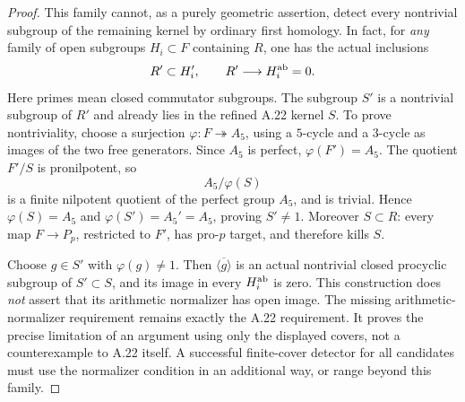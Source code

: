 \begin{proof}
This family cannot, as a purely geometric assertion, detect every nontrivial subgroup of the remaining kernel by ordinary first homology. In fact, for \emph{any} family of open subgroups $H_i\subset F$ containing $R$, one has the actual inclusions
\[
 R'\subset H_i',\qquad R'\longrightarrow H_i^{\rm ab}=0.
\]
Here primes mean closed commutator subgroups. The subgroup $S'$ is a nontrivial subgroup of $R'$ and already lies in the refined A.22 kernel $S$. To prove nontriviality, choose a surjection $\varphi:F\twoheadrightarrow A_5$, using a $5$-cycle and a $3$-cycle as images of the two free generators. Since $A_5$ is perfect, $\varphi(F')=A_5$. The quotient $F'/S$ is pronilpotent, so
\[
 A_5/\varphi(S)
\]
is a finite nilpotent quotient of the perfect group $A_5$, and is trivial. Hence $\varphi(S)=A_5$ and $\varphi(S')=A_5' = A_5$, proving $S'\ne1$. Moreover $S\subset R$: every map $F\to P_p$, restricted to $F'$, has pro-$p$ target, and therefore kills $S$.

Choose $g\in S'$ with $\varphi(g)\ne1$. Then $\overline{\langle g\rangle}$ is an actual nontrivial closed procyclic subgroup of $S'\subset S$, and its image in every $H_i^{\rm ab}$ is zero. This construction does \emph{not} assert that its arithmetic normalizer has open image. The missing arithmetic-normalizer requirement remains exactly the A.22 requirement. It proves the precise limitation of an argument using only the displayed covers, not a counterexample to A.22 itself. A successful finite-cover detector for all candidates must use the normalizer condition in an additional way, or range beyond this family.
\end{proof}

